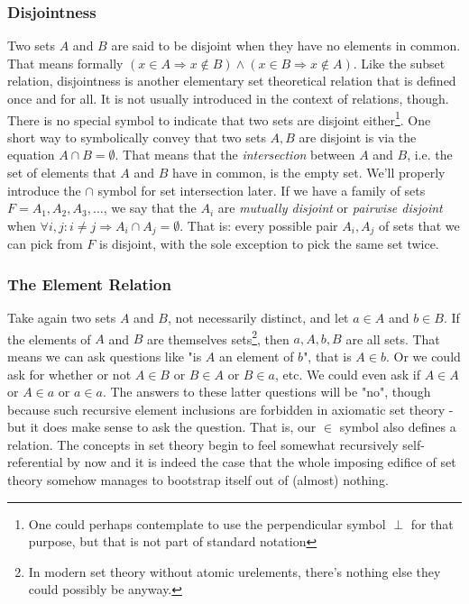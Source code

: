 \subsubsection{Disjointness}
Two sets $A$ and $B$ are said to be disjoint when they have no elements in common. That means formally $(x \in A \Rightarrow x \notin B) \wedge (x \in B \Rightarrow x \notin A)$. Like the subset relation, disjointness is another elementary set theoretical relation that is defined once and for all. It is not usually introduced in the context of relations, though. There is no special symbol to indicate that two sets are disjoint either\footnote{One could perhaps contemplate to use the perpendicular symbol $\perp$ for that purpose, but that is not part of standard notation}. One short way to symbolically convey that two sets $A,B$ are disjoint is via the equation $A \cap B = \emptyset$. That means that the \emph{intersection} between $A$ and $B$, i.e. the set of elements that $A$ and $B$ have in common, is the empty set. We'll properly introduce the $\cap$ symbol for set intersection later. If we have a family of sets $F = A_1, A_2, A_3, \ldots$, we say that the $A_i$ are \emph{mutually disjoint} or \emph{pairwise disjoint} when $\forall i,j: i \neq j \Rightarrow A_i \cap A_j = \emptyset$. That is: every possible pair $A_i, A_j$ of sets that we can pick from $F$ is disjoint, with the sole exception to pick the same set twice.



\subsubsection{The Element Relation} 
Take again two sets $A$ and $B$, not necessarily distinct, and let $a \in A$ and $b \in B$. If the elements of $A$ and $B$ are themselves sets\footnote{In modern set theory without atomic urelements, there's nothing else they could possibly be anyway.}, then $a,A,b,B$ are all sets. That means we can ask questions like "is $A$ an element of $b$", that is $A \in b$. Or we could ask for whether or not $A \in B$ or $B \in A$ or $B \in a$, etc. We could even ask if $A \in A$ or $A \in a$ or $a \in a$. The answers to these latter questions will be "no", though because such recursive element inclusions are forbidden in axiomatic set theory - but it does make sense to ask the question. That is, our $\in$ symbol also defines a relation. The concepts in set theory begin to feel somewhat recursively self-referential by now and it is indeed the case that the whole imposing edifice of set theory somehow manages to bootstrap itself out of (almost) nothing.


